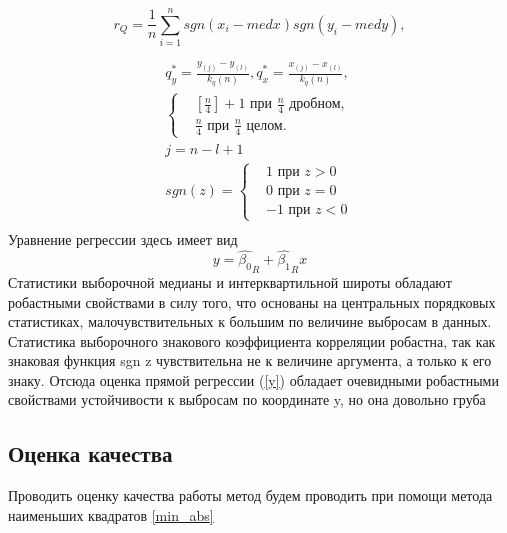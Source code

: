 \documentclass[12pt,a4paper]{scrartcl}
\begin{document}
    \begin{equation}
        r_{Q} = \frac{1}{n}\sum_{i=1}^{n}{sgn(x_{i} - med x)sgn(y_{i} - med y)},
        \label{r_Q}
    \end{equation}
    \begin{multline}
        \\\\
        q^{*}_{y} = \frac{y_{(j)} -y_{(l)}}{k_{q}(n)}, 
        q^{*}_{x} = \frac{x_{(j)} - x_{(l)}}{k_{q}(n)}, \\ 
        \begin{cases}
             & [\frac{n}{4}] + 1 \text{ при } \frac{n}{4} \text{ дробном, } \\ 
             & \frac{n}{4} \text{ при } \frac{n}{4} \text{ целом. }
        \end{cases}\\
        j = n - l + 1\\
        sgn(z) = \begin{cases}
                    & 1 \text{ при } z > 0 \\ 
                    & 0 \text{ при } z = 0 \\
                    & -1 \text{ при } z < 0
                 \end{cases}\\
        \label{q*}        
    \end{multline}
    Уравнение регрессии здесь имеет вид 
    \begin{equation}
        y = \hat{\beta_{0}}_{R} +  \hat{\beta_{1}}_{R}x
        \label{y}
    \end{equation}
    Статистики выборочной медианы и интерквартильной широты обладают робастными свойствами в силу того, что основаны на центральных порядковых статистиках, малочувствительных к большим по величине выбросам в данных. Статистика выборочного знакового коэффициента корреляции робастна, так как знаковая функция sgn z чувствительна не к величине аргумента, а только к его знаку. Отсюда оценка прямой регрессии (\ref{y}) обладает очевидными робастными свойствами устойчивости к выбросам по координате y, но она довольно груба

 \subsection{Оценка качества}
Проводить оценку качества работы метод будем проводить при помощи метода наименьших квадратов \ref{min_abs}
\end{document}

